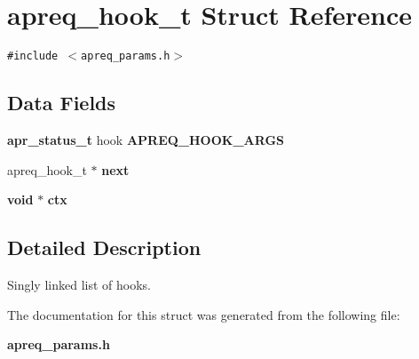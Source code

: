 \section{apreq\_\-hook\_\-t  Struct Reference}
\label{structapreq__hook__t}
{\tt \#include $<$apreq\_\-params.h$>$}

\subsection*{Data Fields}
\begin{CompactItemize}
\item 
{}
{\bf apr\_\-status\_\-t} hook {\bf APREQ\_\-HOOK\_\-ARGS}\label{structapreq__hook__t_m0}

\item 
{}
apreq\_\-hook\_\-t $\ast$ {\bf next}\label{structapreq__hook__t_m1}

\item 
{}
{\bf void} $\ast$ {\bf ctx}\label{structapreq__hook__t_m2}

\end{CompactItemize}


\subsection{Detailed Description}
Singly linked list of hooks. 



The documentation for this struct was generated from the following file:\begin{CompactItemize}
\item 
{\bf apreq\_\-params.h}\end{CompactItemize}
